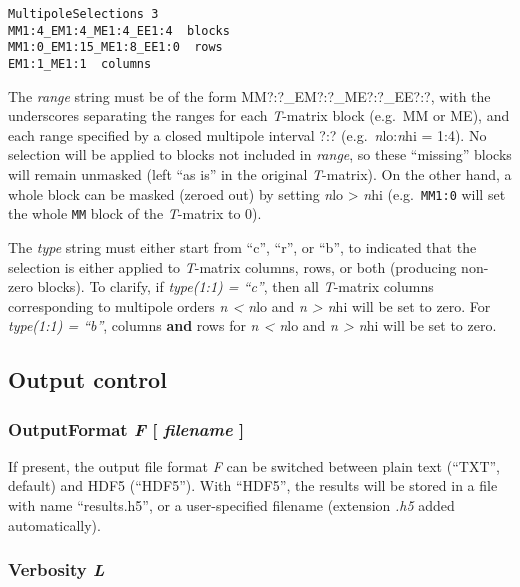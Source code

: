 \documentclass[
]{article}
\begin{document}
\begin{verbatim}
MultipoleSelections 3
MM1:4_EM1:4_ME1:4_EE1:4  blocks
MM1:0_EM1:15_ME1:8_EE1:0  rows
EM1:1_ME1:1  columns
\end{verbatim}

The \emph{range} string must be of the form MM?:?\_EM?:?\_ME?:?\_EE?:?,
with the underscores separating the ranges for each \emph{T}-matrix
block (e.g.~MM or ME), and each range specified by a closed multipole
interval ?:? (e.g.~\emph{n}lo:\emph{n}hi = 1:4). No selection will be
applied to blocks not included in \emph{range}, so these ``missing''
blocks will remain unmasked (left ``as is'' in the original
\emph{T}-matrix). On the other hand, a whole block can be masked (zeroed
out) by setting \emph{n}lo \textgreater{} \emph{n}hi
(e.g.~\texttt{MM1:0} will set the whole \texttt{MM} block of the
\emph{T}-matrix to 0).

The \emph{type} string must either start from ``c'', ``r'', or ``b'', to
indicated that the selection is either applied to \emph{T}-matrix
columns, rows, or both (producing non-zero blocks). To clarify, if
\emph{type(1:1) = ``c''}, then all \emph{T}-matrix columns corresponding
to multipole orders \emph{n \textless{} n}lo and \emph{n \textgreater{}
n}hi will be set to zero. For \emph{type(1:1) = ``b''}, columns
\textbf{and} rows for \emph{n \textless{} n}lo and \emph{n
\textgreater{} n}hi will be set to zero.

\hypertarget{output-control}{%
\subsection{Output control}\label{output-control}}

\hypertarget{outputformat-f-filename}{%
\subsubsection{\texorpdfstring{OutputFormat \emph{F} {[} \emph{filename}
{]}}{OutputFormat F {[} filename {]}}}\label{outputformat-f-filename}}

If present, the output file format \emph{F} can be switched between
plain text (``TXT'', default) and HDF5 (``HDF5''). With ``HDF5'', the
results will be stored in a file with name ``results.h5'', or a
user-specified filename (extension \emph{.h5} added automatically).

\hypertarget{verbosity-l}{%
\subsubsection{\texorpdfstring{Verbosity
\emph{L}}{Verbosity L}}\label{verbosity-l}}
\end{document}
